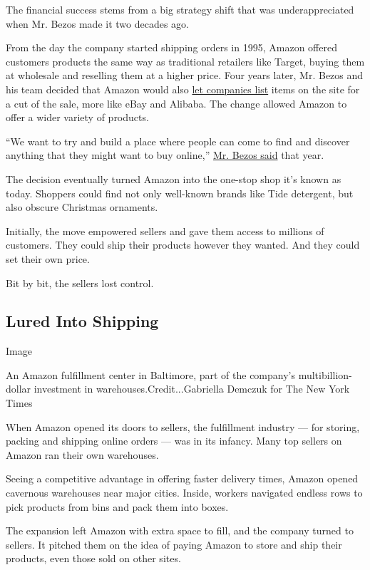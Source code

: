 The financial success stems from a big strategy shift that was
underappreciated when Mr. Bezos made it two decades ago.

From the day the company started shipping orders in 1995, Amazon offered
customers products the same way as traditional retailers like Target,
buying them at wholesale and reselling them at a higher price. Four
years later, Mr. Bezos and his team decided that Amazon would also
\href{https://www.nytimes3xbfgragh.onion/1999/03/30/business/the-next-trick-for-amazoncom-auctions.html}{let
companies list} items on the site for a cut of the sale, more like eBay
and Alibaba. The change allowed Amazon to offer a wider variety of
products.

``We want to try and build a place where people can come to find and
discover anything that they might want to buy online,''
\href{https://charlierose.com/videos/28965}{Mr. Bezos said} that year.

The decision eventually turned Amazon into the one-stop shop it's known
as today. Shoppers could find not only well-known brands like Tide
detergent, but also obscure Christmas ornaments.

Initially, the move empowered sellers and gave them access to millions
of customers. They could ship their products however they wanted. And
they could set their own price.

Bit by bit, the sellers lost control.

\hypertarget{lured-into-shipping}{%
\subsection{Lured Into Shipping}\label{lured-into-shipping}}

Image

An Amazon fulfillment center in Baltimore, part of the company's
multibillion-dollar investment in warehouses.Credit...Gabriella Demczuk
for The New York Times

When Amazon opened its doors to sellers, the fulfillment industry ---
for storing, packing and shipping online orders --- was in its infancy.
Many top sellers on Amazon ran their own warehouses.

Seeing a competitive advantage in offering faster delivery times, Amazon
opened cavernous warehouses near major cities. Inside, workers navigated
endless rows to pick products from bins and pack them into boxes.

The expansion left Amazon with extra space to fill, and the company
turned to sellers. It pitched them on the idea of paying Amazon to store
and ship their products, even those sold on other sites.

